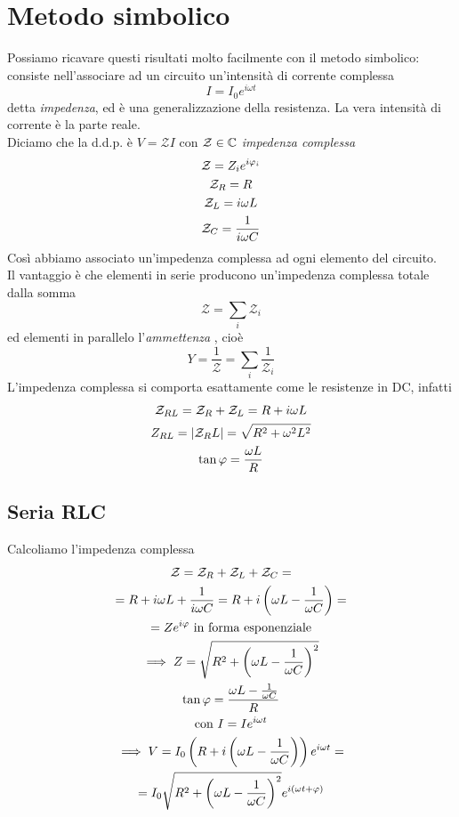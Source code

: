 \section{Metodo simbolico}
Possiamo ricavare questi risultati molto facilmente con il metodo simbolico: consiste nell'associare ad un circuito un'intensità di corrente complessa 
\begin{equation}
	I=I_0 e^{i\omega t}
\end{equation} detta \textit{impedenza}, ed è una generalizzazione della resistenza. La vera intensità di corrente è la parte reale.\\
Diciamo che la d.d.p. è $V=\mathcal{Z}I$ con $\mathcal{Z}\in\mathbb{C} $
\textit{impedenza complessa} 
\begin{gather*}
	\mathcal{Z}=Z_i e^{i\oldphi_i}\\
	\mathcal{Z}_R=R\\
	\mathcal{Z}_L=i\omega L\\
	\mathcal{Z}_C=\frac{1}{i\omega C}
\end{gather*}
Così abbiamo associato un'impedenza complessa ad ogni elemento del circuito.\\
Il vantaggio è che elementi in serie producono un'impedenza complessa totale dalla somma
\begin{equation*}
	\mathcal{Z}=\sum_i \mathcal{Z}_i
\end{equation*} ed elementi in parallelo l'\textit{ammettenza} , cioè
\begin{equation}
	Y=\frac{1}{\mathcal{Z}}=\sum_i \frac{1}{\mathcal{Z}_i}
\end{equation} 
L'impedenza complessa si comporta esattamente come le resistenze in DC, infatti
\begin{gather*}
	\mathcal{Z}_{RL}=\mathcal{Z}_R +\mathcal{Z}_L=R+i\omega L\\
	Z_{RL}=\abs{\mathcal{Z}_RL}=\sqrt{R^2+\omega^2 L^2}\\
	\tan\oldphi=\frac{\omega L}{R}
\end{gather*}


\subsection{Seria RLC}
Calcoliamo l'impedenza complessa
\begin{gather*}
	\mathcal{Z}=\mathcal{Z}_R+\mathcal{Z}_L+\mathcal{Z}_C=\\
	=R+i\omega L+\frac{1}{i\omega  C }=R+i\left(\omega L-\frac{1}{\omega C}\right) =\\ =Ze^{i\oldphi} \text{ in forma esponenziale}\\
	\implies Z=\sqrt{R^2 +\left(\omega L-\frac{1}{\omega C}\right)^2}\\
	\tan\oldphi=\frac{\omega L -\frac{1}{\omega C}}{R}\\
	\text{con }	I=Ie^{i\omega t}\\
	\implies V=I_0\left(R+i\left(\omega L-\frac{1}{\omega C}\right)\right)e^{i\omega t}=\\ =I_0 \sqrt{R^2 +\left(\omega L-\frac{1}{\omega C}\right)^2} e^{i(\omega t +\oldphi)}
\end{gather*}

